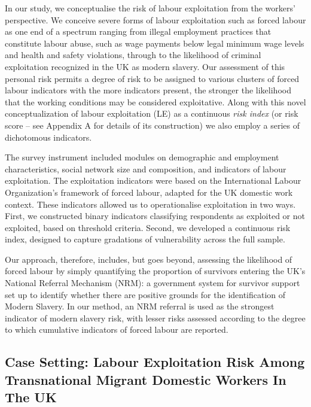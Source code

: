 \documentclass[
  12pt,
  letterpaper,
  DIV=11,
  numbers=noendperiod]{scrartcl}
\theoremstyle{plain}
\theoremstyle{definition}
\begin{document}
In our study, we conceptualise the risk of labour exploitation from the
workers' perspective. We conceive severe forms of labour exploitation
such as forced labour as one end of a spectrum ranging from illegal
employment practices that constitute labour abuse, such as wage payments
below legal minimum wage levels and health and safety violations,
through to the likelihood of criminal exploitation recognized in the UK
as modern slavery. Our assessment of this personal risk permits a degree
of risk to be assigned to various clusters of forced labour indicators
with the more indicators present, the stronger the likelihood that the
working conditions may be considered exploitative. Along with this novel
conceptualization of labour exploitation (LE) as a continuous \emph{risk
index} (or risk score -- see Appendix A for details of its construction)
we also employ a series of dichotomous indicators.

The survey instrument included modules on demographic and employment
characteristics, social network size and composition, and indicators of
labour exploitation. The exploitation indicators were based on the
International Labour Organization's framework of forced labour, adapted
for the UK domestic work context. These indicators allowed us to
operationalise exploitation in two ways. First, we constructed binary
indicators classifying respondents as exploited or not exploited, based
on threshold criteria. Second, we developed a continuous risk index,
designed to capture gradations of vulnerability across the full sample.

Our approach, therefore, includes, but goes beyond, assessing the
likelihood of forced labour by simply quantifying the proportion of
survivors entering the UK's National Referral Mechanism (NRM): a
government system for survivor support set up to identify whether there
are positive grounds for the identification of Modern Slavery. In our
method, an NRM referral is used as the strongest indicator of modern
slavery risk, with lesser risks assessed according to the degree to
which cumulative indicators of forced labour are reported.

\subsection{Case Setting: Labour Exploitation Risk Among Transnational
Migrant Domestic Workers In The
UK}\label{case-setting-labour-exploitation-risk-among-transnational-migrant-domestic-workers-in-the-uk}
\end{document}
